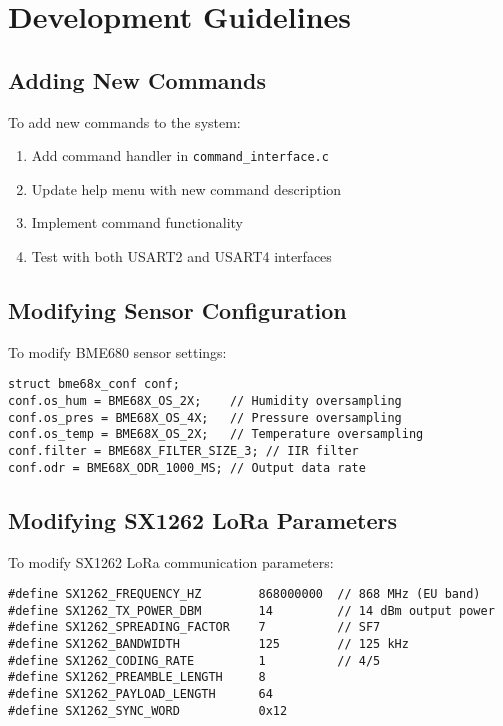 \documentclass[11pt,a4paper]{article}
\begin{document}
\section{Development Guidelines}

\subsection{Adding New Commands}
To add new commands to the system:

\begin{enumerate}
    \item Add command handler in \texttt{command\_interface.c}
    \item Update help menu with new command description
    \item Implement command functionality
    \item Test with both USART2 and USART4 interfaces
\end{enumerate}

\subsection{Modifying Sensor Configuration}
To modify BME680 sensor settings:

\begin{lstlisting}[caption=BME680 Configuration Example]
struct bme68x_conf conf;
conf.os_hum = BME68X_OS_2X;    // Humidity oversampling
conf.os_pres = BME68X_OS_4X;   // Pressure oversampling
conf.os_temp = BME68X_OS_2X;   // Temperature oversampling
conf.filter = BME68X_FILTER_SIZE_3; // IIR filter
conf.odr = BME68X_ODR_1000_MS; // Output data rate
\end{lstlisting}

\subsection{Modifying SX1262 LoRa Parameters}
To modify SX1262 LoRa communication parameters:

\begin{lstlisting}[caption=SX1262 LoRa Configuration Example]
#define SX1262_FREQUENCY_HZ        868000000  // 868 MHz (EU band)
#define SX1262_TX_POWER_DBM        14         // 14 dBm output power
#define SX1262_SPREADING_FACTOR    7          // SF7
#define SX1262_BANDWIDTH           125        // 125 kHz
#define SX1262_CODING_RATE         1          // 4/5
#define SX1262_PREAMBLE_LENGTH     8
#define SX1262_PAYLOAD_LENGTH      64
#define SX1262_SYNC_WORD           0x12
\end{lstlisting}
\end{document}
